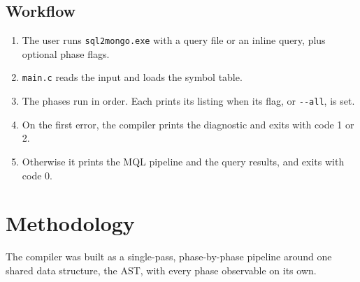 \documentclass[12pt,a4paper]{report}
\newcommand{\codeus}{\textunderscore\allowbreak}
\DeclareRobustCommand{\code}[1]{\texttt{\let\_\codeus #1}}
\begin{document}
\section{Workflow}
\begin{enumerate}
  \item The user runs \code{sql2mongo.exe} with a query file or an inline query, plus optional phase flags.
  \item \code{main.c} reads the input and loads the symbol table.
  \item The phases run in order. Each prints its listing when its flag, or \code{-{}-all}, is set.
  \item On the first error, the compiler prints the diagnostic and exits with code 1 or 2.
  \item Otherwise it prints the MQL pipeline and the query results, and exits with code 0.
\end{enumerate}

\chapter{Methodology}
The compiler was built as a single-pass, phase-by-phase pipeline around one shared data structure, the AST, with every phase observable on its own.
\end{document}
